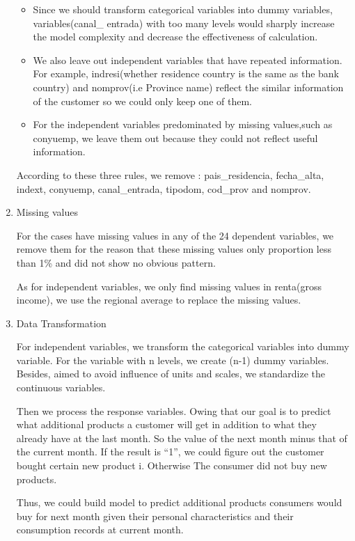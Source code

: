 \documentclass{article}
\begin{document}
\begin{spacing}{1}
\begin{large}
\begin{enumerate}
	\begin{itemize}
		\item Since we should transform categorical variables into dummy variables, variables(canal\_ entrada) with too many levels would sharply increase the model complexity and decrease the effectiveness of calculation.

		\item We also leave out independent variables that have repeated information. For example, indresi(whether residence country is the same as the bank country) and nomprov(i.e Province name) reflect the similar information of the customer so we could only keep one of them.

		\item For the independent variables predominated by missing values,such as conyuemp, we leave them out because they could not reflect useful information.
	\end{itemize}

	According to these three  rules, we remove : pais\_residencia, fecha\_alta, indext, conyuemp, canal\_entrada, tipodom, cod\_prov and nomprov.

	\item  Missing values

	For the cases have missing values in any of the 24 dependent variables, we remove them for the reason that these missing values only proportion less than 1\% and did not show no obvious pattern.

	As for independent variables, we only find missing values in renta(gross income), we use the regional average to replace the missing values.

	\item Data Transformation

	For independent variables, we transform the categorical variables into dummy variable. For the variable with n levels, we create (n-1) dummy variables. Besides, aimed to avoid influence of units and scales, we standardize the continuous variables.

	Then we process the response variables.  Owing that our goal is to predict what additional products a customer will get in addition to what they already have at the last month. So the value of the next month minus that of the current month.  If the result is “1”, we could figure out the customer bought certain new product i. Otherwise The consumer did not buy new products.

	Thus, we could build model to predict additional products consumers would buy for next month given their personal characteristics and their consumption records at current month.
\end{enumerate}


\end{large}
\end{spacing}
\end{document}
